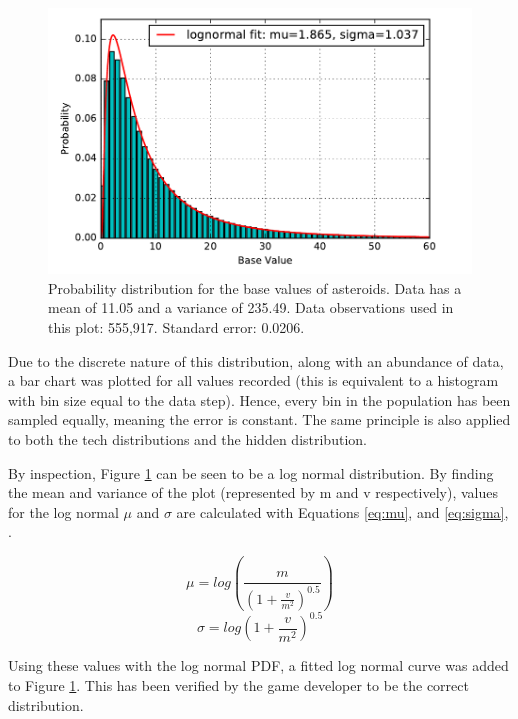\documentclass[11pt, twoside]{article}
\begin{document}
\begin{figure}[h!]
	\centering
	\includegraphics[width=\textwidth,keepaspectratio]{base_distribution.pdf}
	\caption{Probability distribution for the base values of asteroids. Data has a mean of 11.05 and a variance of 235.49. Data observations used in this plot: 555,917. Standard error: 0.0206.}
	\label{BaseDistribution}
\end{figure}

Due to the discrete nature of this distribution, along with an abundance of data, a bar chart was plotted for all values recorded (this is equivalent to a histogram with bin size equal to the data step). Hence, every bin in the population has been sampled equally, meaning the error is constant. The same principle is also applied to both the tech distributions and the hidden distribution.

By inspection, Figure \ref{BaseDistribution} can be seen to be a log normal distribution. By finding the mean and variance of the plot (represented by m and v respectively), values for the log normal $\mu$ and $\sigma$ are calculated with Equations \ref{eq:mu}, and \ref{eq:sigma}, \cite{forbes2011statistical}.

\begin{multicols}{2}
	\begin{equation}
		\label{eq:mu}
		\mu = log\left(\frac{m}{\left(1+\frac{v}{m^2}\right)^{0.5}}\right)
	\end{equation} \break
	\begin{equation}
		\label{eq:sigma}
		\sigma = {log\left(1+\dfrac{v}{m^2}\right)}^{0.5}
	\end{equation}
\end{multicols}

Using these values with the log normal PDF, a fitted log normal curve was added to Figure \ref{BaseDistribution}. This has been verified by the game developer to be the correct distribution.
\end{document}
